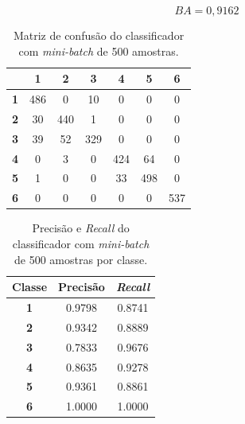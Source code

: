 \begin{equation}\label{eq:ba_lr_500}
	BA = 0,9162
\end{equation}

\begin{table}[H]
	\centering
\begin{tabular}{c||c|c|c|c|c|c|}
	\cline{2-7}
	& \textbf{1} & \textbf{2} & \textbf{3} & \textbf{4} & \textbf{5} & \textbf{6} \\ \hline \hline
	\multicolumn{1}{|c||}{\textbf{1}} & 486        & 0          & 10         & 0          & 0          & 0          \\ \hline
	\multicolumn{1}{|c||}{\textbf{2}} & 30         & 440        & 1          & 0          & 0          & 0          \\ \hline
	\multicolumn{1}{|c||}{\textbf{3}} & 39         & 52         & 329        & 0          & 0          & 0          \\ \hline
	\multicolumn{1}{|c||}{\textbf{4}} & 0          & 3          & 0          & 424        & 64         & 0          \\ \hline
	\multicolumn{1}{|c||}{\textbf{5}} & 1          & 0          & 0          & 33         & 498        & 0          \\ \hline
	\multicolumn{1}{|c||}{\textbf{6}} & 0          & 0          & 0          & 0          & 0          & 537        \\ \hline
\end{tabular}
	\caption{Matriz de confusão do classificador com \textit{mini-batch} de 500 amostras.}
	\label{tab:mc_lr_500}
\end{table}

\begin{table}[H]
	\centering
	\begin{tabular}{c|c|c}
		\textbf{Classe} & \textbf{Precisão} & \textit{\textbf{Recall}} \\ \hline
		\textbf{1}      & 0.9798            & 0.8741                   \\
		\textbf{2}      & 0.9342            & 0.8889                   \\
		\textbf{3}      & 0.7833            & 0.9676                   \\
		\textbf{4}      & 0.8635            & 0.9278                   \\
		\textbf{5}      & 0.9361            & 0.8861                   \\
		\textbf{6}      & 1.0000            & 1.0000                  
	\end{tabular}
	\caption{Precisão e \textit{Recall} do classificador com \textit{mini-batch} de 500 amostras por classe.}
	\label{tab:pr_lr_500}
\end{table}




